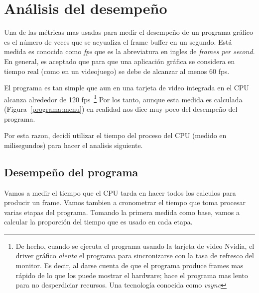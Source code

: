 \section{Análisis del desempeño}

Una de las métricas mas usadas para medir el desempeño de un programa gráfico es el número de veces que se acyualiza el frame buffer en un segundo.
Está medida es conocida como \emph{fps} que es la abreviatura en ingles de  \emph{\textenglish{frames per second}}.
En general, es aceptado que para que una aplicación gráfica se considera en tiempo real (como en un videojuego) se debe de alcanzar al menos 60 fps.

El programa es tan simple que aun en una tarjeta de video integrada en el CPU alcanza alrededor de 120 fps~\footnote{De hecho, cuando se ejecuta el programa usando la tarjeta de video Nvidia, el driver gráfico \emph{alenta} el programa para sincronizarse con la tasa de refresco del monitor. Es decir, al darse cuenta de que el programa produce frames mas rápido de lo que los puede mostrar el hardware; hace el programa mas lento para no desperdiciar recursos. Una tecnología conocida como \emph{\textenglish{vsync}}}
Por los tanto, aunque esta medida es calculada (Figura~\ref{programa:menu}) en realidad nos dice muy poco del desempeño del programa.

Por esta razon, decidí utilizar el tiempo del proceso del CPU (medido en milisegundos) para hacer el analisis siguiente.

\subsection{Desempeño del programa}

Vamos a medir el tiempo que el CPU tarda en hacer todos los calculos para producir un frame.
Vamos tambien a cronometrar el tiempo que toma procesar varias etapas del programa.
Tomando la primera medida como base, vamos a calcular la proporción del tiempo que es usado en cada etapa.

